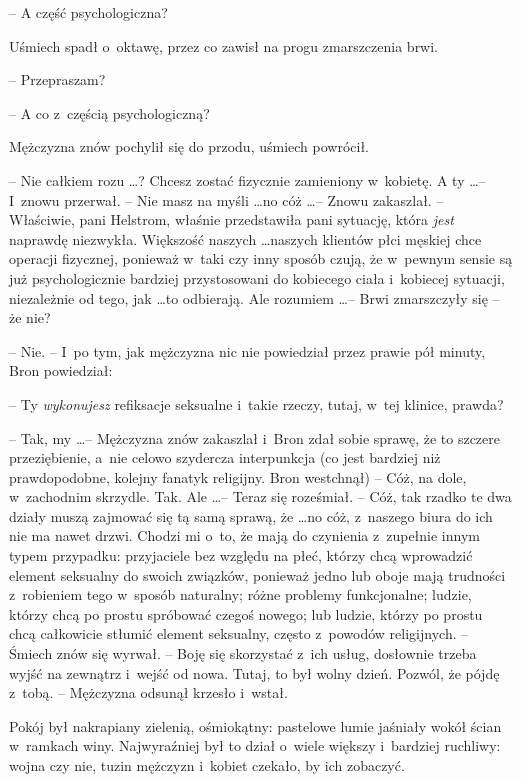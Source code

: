 \documentclass[oneside,polish,11pt,rmheadings]{mwbk}
\begin{document}
-- A część psychologiczna? 

Uśmiech spadł o~oktawę, przez co zawisł na progu zmarszczenia brwi. 

-- Przepraszam? 

-- A co z~częścią psychologiczną?  

Mężczyzna znów pochylił się do przodu, uśmiech powrócił. 

-- Nie całkiem rozu \ldots ? Chcesz zostać fizycznie zamieniony w~kobietę. A ty \ldots  --  I~znowu przerwał. -- Nie masz na myśli \ldots  no cóż \ldots  -- Znowu zakaszlał. -- Właściwie, pani Helstrom, właśnie przedstawiła pani sytuację, która \textit{jest }naprawdę niezwykła. Większość naszych \ldots  naszych klientów płci męskiej chce operacji fizycznej, ponieważ w~taki czy inny sposób czują, że w~pewnym sensie są już psychologicznie bardziej przystosowani do kobiecego ciała i~kobiecej sytuacji, niezależnie od tego, jak \ldots  to odbierają. Ale rozumiem \ldots  -- Brwi zmarszczyły się --  że nie?  

-- Nie. -- I~po tym, jak mężczyzna nic nie powiedział przez prawie pół minuty, Bron powiedział: 

-- Ty \textit{wykonujesz} refiksacje seksualne i~takie rzeczy, tutaj, w~tej klinice, prawda?  

--  Tak, my \ldots  -- Mężczyzna znów zakaszlał i~Bron zdał sobie sprawę, że to szczere przeziębienie, a~nie celowo szydercza interpunkcja (co jest bardziej niż prawdopodobne, kolejny fanatyk religijny. Bron westchnął) -- Cóż, na dole, w~zachodnim skrzydle. Tak. Ale \ldots  -- Teraz się roześmiał. -- Cóż, tak rzadko te dwa działy muszą zajmować się tą samą sprawą, że \ldots  no cóż, z~naszego biura do ich nie ma nawet drzwi. Chodzi mi o~to, że mają do czynienia z~zupełnie innym typem przypadku: przyjaciele bez względu na płeć, którzy chcą wprowadzić element seksualny do swoich związków, ponieważ jedno lub oboje mają trudności z~robieniem tego w~sposób naturalny; różne problemy funkcjonalne; ludzie, którzy chcą po prostu spróbować czegoś nowego; lub ludzie, którzy po prostu chcą całkowicie stłumić element seksualny, często z~powodów religijnych. -- Śmiech znów się wyrwał. -- Boję się skorzystać z~ich usług, dosłownie trzeba wyjść na zewnątrz i~wejść od nowa. Tutaj, to był wolny dzień. Pozwól, że pójdę z~tobą. -- Mężczyzna odsunął krzesło i~wstał. 

Pokój był nakrapiany zielenią, ośmiokątny: pastelowe lumie jaśniały wokół ścian w~ramkach winy. Najwyraźniej był to dział o~wiele większy i~bardziej ruchliwy: wojna czy nie, tuzin mężczyzn i~kobiet czekało, by ich zobaczyć. 
\end{document}
